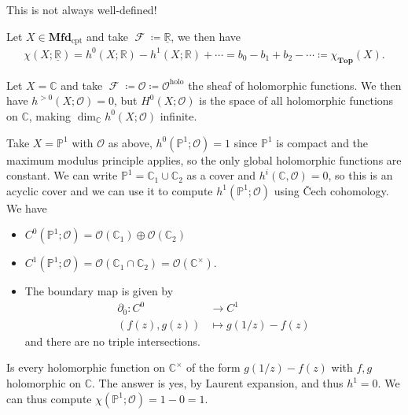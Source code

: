 \begin{warnings}

This is not always well-defined!

\end{warnings}

\begin{example}[?]

Let \(X\in {\mathbf{Mfd}}_{\text{cpt}}\) and take
\(\operatorname{\mathcal{F}} \coloneqq\underline{{\mathbb{R}}}\), we
then have
\begin{align*}
\chi(X; \underline{{\mathbb{R}}}) = h^0(X; {\mathbb{R}}) - h^1(X; {\mathbb{R}}) + \cdots = b_0 - b_1 + b_2 - \cdots \coloneqq\chi_{{\mathbf{Top}}}(X)
.\end{align*}

\end{example}

\begin{example}[?]

Let \(X = {\mathbb{C}}\) and take
\(\operatorname{\mathcal{F}} \coloneqq{\mathcal{O}}\coloneqq{\mathcal{O}}^{\text{holo}}\)
the sheaf of holomorphic functions. We then have
\(h^{> 0}(X; {\mathcal{O}}) = 0\), but \(H^0(X; {\mathcal{O}})\) is the
space of all holomorphic functions on \({\mathbb{C}}\), making
\(\dim_{\mathbb{C}}h^0(X; {\mathcal{O}})\) infinite.

\end{example}

\begin{example}[?]

Take \(X = {\mathbb{P}}^1\) with \({\mathcal{O}}\) as above,
\(h^0({\mathbb{P}}^1; {\mathcal{O}}) = 1\) since \({\mathbb{P}}^1\) is
compact and the maximum modulus principle applies, so the only global
holomorphic functions are constant. We can write
\({\mathbb{P}}^1 = {\mathbb{C}}_1 \cup{\mathbb{C}}_2\) as a cover and
\(h^i({\mathbb{C}}, {\mathcal{O}}) = 0\), so this is an acyclic cover
and we can use it to compute \(h^1({\mathbb{P}}^1; {\mathcal{O}})\)
using Čech cohomology. We have

\begin{itemize}
\item
  \(C^0({\mathbb{P}}^1; {\mathcal{O}}) = {\mathcal{O}}({\mathbb{C}}_1) \oplus {\mathcal{O}}({\mathbb{C}}_2)\)
\item
  \(C^1({\mathbb{P}}^1; {\mathcal{O}}) = {\mathcal{O}}({\mathbb{C}}_1 \cap{\mathbb{C}}_2) = {\mathcal{O}}({\mathbb{C}}^{\times})\).
\item
  The boundary map is given by
  \begin{align*}
  {\partial}_0: C^0 &\to C^1 \\
  ( f(z), g(z) ) &\mapsto g(1/z) - f(z)
  \end{align*}
  and there are no triple intersections.
\end{itemize}

Is every holomorphic function on \({\mathbb{C}}^{\times}\) of the form
\(g(1/z) - f(z)\) with \(f,g\) holomorphic on \({\mathbb{C}}\). The
answer is yes, by Laurent expansion, and thus \(h^1 = 0\). We can thus
compute \(\chi({\mathbb{P}}^1; {\mathcal{O}}) = 1-0 = 1\).

\end{example}

